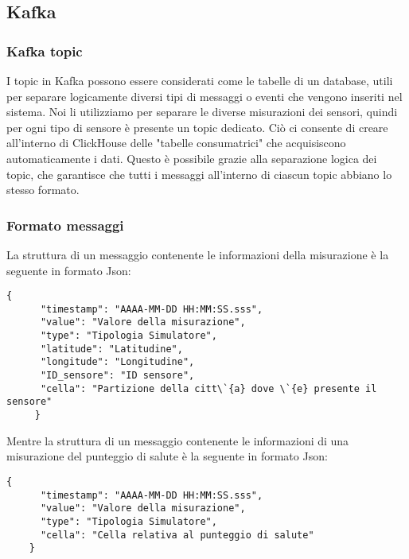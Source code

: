 \subsection{Kafka}
\subsubsection{Kafka topic}
I topic in Kafka possono essere considerati come le tabelle di un database, utili per separare logicamente diversi tipi di messaggi o eventi che vengono inseriti nel sistema. Noi li utilizziamo per separare le diverse misurazioni dei sensori, quindi per ogni tipo di sensore è presente un topic dedicato. Ciò ci consente di creare all'interno di ClickHouse delle "tabelle consumatrici" che acquisiscono automaticamente i dati. Questo è possibile grazie alla separazione logica dei topic, che garantisce che tutti i messaggi all'interno di ciascun topic abbiano lo stesso formato.
\subsubsection{Formato messaggi} \label{sec:formatoMessaggi}
La struttura di un messaggio contenente le informazioni della misurazione è la seguente in formato Json:
\begin{lstlisting}[style=code]
    {
      "timestamp": "AAAA-MM-DD HH:MM:SS.sss", 
      "value": "Valore della misurazione",  
      "type": "Tipologia Simulatore",
      "latitude": "Latitudine",
      "longitude": "Longitudine",
      "ID_sensore": "ID sensore",
      "cella": "Partizione della citt\`{a} dove \`{e} presente il sensore" 
     }
\end{lstlisting}
Mentre la struttura di un messaggio contenente le informazioni di una misurazione del punteggio di salute è la seguente in formato Json:
\begin{lstlisting}[style=code]
    {
      "timestamp": "AAAA-MM-DD HH:MM:SS.sss", 
      "value": "Valore della misurazione",  
      "type": "Tipologia Simulatore",
      "cella": "Cella relativa al punteggio di salute"
    }
\end{lstlisting}


